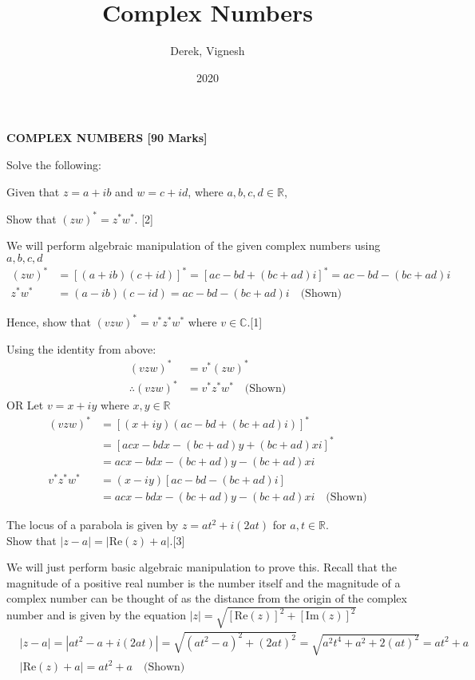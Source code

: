 \documentclass[12pt, a4 paper]{article}
\title{Complex Numbers}
\author{Derek, Vignesh}
\date{2020}
\begin{document}
\maketitle

\textbf{COMPLEX NUMBERS [90 Marks]}
\begin{outline}[enumerate]
	\1 Solve the following: %
			    
	\2 Given that $z=a+ib$ and $w=c+id$, where $a,b,c,d \in \mathbb{R}$, %
			        
	\3 Show that $(zw)^*=z^*w^*$. \hfill[2]
	\begin{answer}
		We will perform algebraic manipulation of the given complex numbers using $a,b,c,d$
		\begin{align*}
			(zw)^* & = [(a+ib)(c+id)]^* = [ac-bd+(bc+ad)i]^* = ac-bd-(bc+ad)i \\
			z^*w^* & = (a-ib)(c-id) = ac-bd-(bc+ad)i\quad\textrm{(Shown)}     
		\end{align*}
	\end{answer}
	\3 Hence, show that $(vzw)^*=v^*z^*w^*$ where $v \in \mathbb{C}$.\hfill[1]
	\begin{answer}
		Using the identity from above:
		\begin{align*}
			(vzw)^*            & = v^*(zw)^*                      \\
			\therefore (vzw)^* & = v^*z^*w^*\quad\textrm{(Shown)} 
		\end{align*}
		OR Let $v=x+iy$ where $x,y \in \mathbb{R}$
		\begin{align*}
			(vzw)^*   & = [(x+iy)(ac-bd+(bc+ad)i)]^*                      \\
			          & = [acx-bdx-(bc+ad)y+(bc+ad)xi]^*                  \\
			          & = acx-bdx-(bc+ad)y-(bc+ad)xi                      \\
			v^*z^*w^* & = (x-iy)[ac-bd-(bc+ad)i]                          \\
			          & = acx-bdx-(bc+ad)y-(bc+ad)xi\quad\textrm{(Shown)} 
		\end{align*}
	\end{answer}
			            
	\2 The locus of a parabola is given by $z=at^2+i(2at)$ for $a,t \in \mathbb{R}$.\\ Show that $|z-a|=|\textrm{Re}(z)+a|$.\hfill[3] %
	\begin{answer}
		We will just perform basic algebraic manipulation to prove this. Recall that the magnitude of a positive real number is the number itself and the magnitude of a complex number can be thought of as the distance from the origin of the complex number and is given by the equation $|z|=\sqrt{[\textrm{Re}(z)]^2+[\textrm{Im}(z)]^2}$
		\begin{align*}
			  & |z-a| = |at^2-a+i(2at)| = \sqrt{(at^2-a)^2+(2at)^2} = \sqrt{a^2t^4+a^2+2(at)^2} = at^2 + a \\
			  & |\textrm{Re}(z)+a| = at^2+a \quad\textrm{(Shown)}                                          
		\end{align*}
	\end{answer}
			        

\end{outline}
\end{document}

